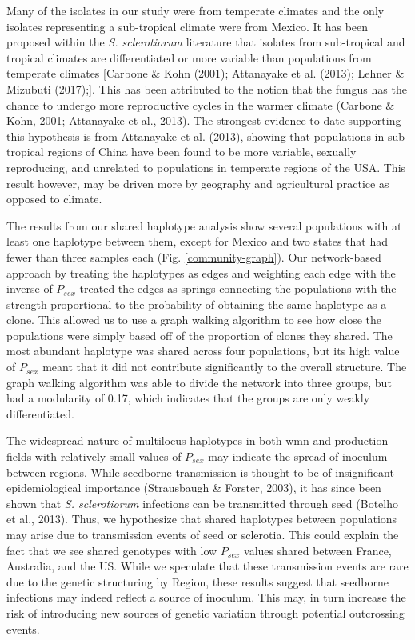 \documentclass[fleqn,10pt,lineno]{wlpeerj} %
\theoremstyle{definition}
\theoremstyle{definition}
\theoremstyle{definition}
\theoremstyle{remark}
\begin{document}
Many of the isolates in our study were from temperate climates and the
only isolates representing a sub-tropical climate were from Mexico. It
has been proposed within the \emph{S. sclerotiorum} literature that
isolates from sub-tropical and tropical climates are differentiated or
more variable than populations from temperate climates {[}Carbone \&
Kohn (2001); Attanayake et al. (2013); Lehner \& Mizubuti (2017);{]}.
This has been attributed to the notion that the fungus has the chance to
undergo more reproductive cycles in the warmer climate (Carbone \& Kohn,
2001; Attanayake et al., 2013). The strongest evidence to date
supporting this hypothesis is from Attanayake et al. (2013), showing
that populations in sub-tropical regions of China have been found to be
more variable, sexually reproducing, and unrelated to populations in
temperate regions of the USA. This result however, may be driven more by
geography and agricultural practice as opposed to climate.

The results from our shared haplotype analysis show several populations
with at least one haplotype between them, except for Mexico and two
states that had fewer than three samples each (Fig.
\ref{community-graph}). Our network-based approach by treating the
haplotypes as edges and weighting each edge with the inverse of
\(P_{sex}\) treated the edges as springs connecting the populations with
the strength proportional to the probability of obtaining the same
haplotype as a clone. This allowed us to use a graph walking algorithm
to see how close the populations were simply based off of the proportion
of clones they shared. The most abundant haplotype was shared across
four populations, but its high value of \(P_{sex}\) meant that it did
not contribute significantly to the overall structure. The graph walking
algorithm was able to divide the network into three groups, but had a
modularity of 0.17, which indicates that the groups are only weakly
differentiated.

The widespread nature of multilocus haplotypes in both wmn and
production fields with relatively small values of \(P_{sex}\) may
indicate the spread of inoculum between regions. While seedborne
transmission is thought to be of insignificant epidemiological
importance (Strausbaugh \& Forster, 2003), it has since been shown that
\emph{S. sclerotiorum} infections can be transmitted through seed
(Botelho et al., 2013). Thus, we hypothesize that shared haplotypes
between populations may arise due to transmission events of seed or
sclerotia. This could explain the fact that we see shared genotypes with
low \(P_{sex}\) values shared between France, Australia, and the US.
While we speculate that these transmission events are rare due to the
genetic structuring by Region, these results suggest that seedborne
infections may indeed reflect a source of inoculum. This may, in turn
increase the risk of introducing new sources of genetic variation
through potential outcrossing events.
\end{document}
